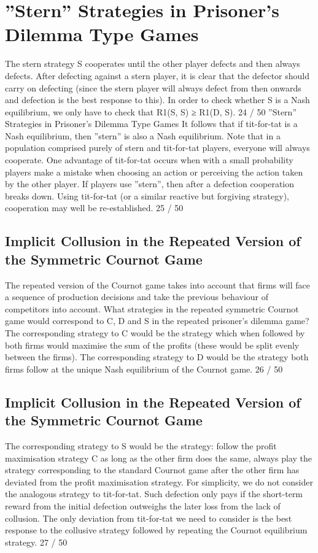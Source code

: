 \documentclass[]{report}
\begin{document}
\section{”Stern” Strategies in Prisoner’s Dilemma Type Games}
The stern strategy S cooperates until the other player defects and
then always defects.
After defecting against a stern player, it is clear that the defector
should carry on defecting (since the stern player will always defect
from then onwards and defection is the best response to this).
In order to check whether S is a Nash equilibrium, we only have to
check that R1(S, S) ≥ R1(D, S).
24 / 50
”Stern” Strategies in Prisoner’s Dilemma Type Games
It follows that if tit-for-tat is a Nash equilibrium, then ”stern” is
also a Nash equilibrium.
Note that in a population comprised purely of stern and tit-for-tat
players, everyone will always cooperate.
One advantage of tit-for-tat occurs when with a small probability
players make a mistake when choosing an action or perceiving the
action taken by the other player.
If players use ”stern”, then after a defection cooperation breaks
down. Using tit-for-tat (or a similar reactive but forgiving
strategy), cooperation may well be re-established.
25 / 50

\subsection{Implicit Collusion in the Repeated Version of the Symmetric Cournot Game}
The repeated version of the Cournot game takes into account that
firms will face a sequence of production decisions and take the
previous behaviour of competitors into account.
What strategies in the repeated symmetric Cournot game would
correspond to C, D and S in the repeated prisoner’s dilemma
game?
The corresponding strategy to C would be the strategy which
when followed by both firms would maximise the sum of the profits
(these would be split evenly between the firms).
The corresponding strategy to D would be the strategy both firms
follow at the unique Nash equilibrium of the Cournot game.
26 / 50

\subsection{Implicit Collusion in the Repeated Version of the Symmetric Cournot Game}
The corresponding strategy to S would be the strategy: follow the
profit maximisation strategy C as long as the other firm does the
same, always play the strategy corresponding to the standard
Cournot game after the other firm has deviated from the profit
maximisation strategy.
For simplicity, we do not consider the analogous strategy to
tit-for-tat.
Such defection only pays if the short-term reward from the initial
defection outweighs the later loss from the lack of collusion. The
only deviation from tit-for-tat we need to consider is the best
response to the collusive strategy followed by repeating the
Cournot equilibrium strategy.
27 / 50
\end{document}
